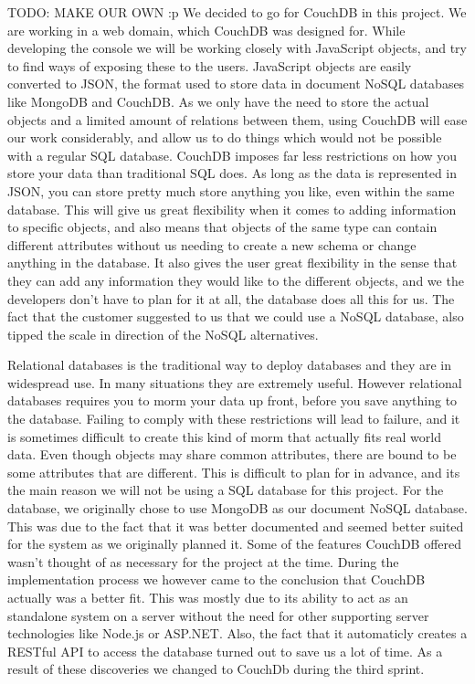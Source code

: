 TODO: MAKE OUR OWN :p
We decided to go for CouchDB in this project. We are working in a web domain, which CouchDB was designed for. While developing the console we will be working closely with JavaScript objects, and try to find ways of exposing these to the users. JavaScript objects are easily converted to JSON, the format used to store data in document NoSQL databases like MongoDB and CouchDB.  As we only have the need to store the actual objects and a limited amount of relations between them, using CouchDB will ease our work considerably, and allow us to do things which would not be possible with a regular SQL database. CouchDB imposes far less restrictions on how you store your data than traditional SQL does. As long as the data is represented in JSON, you can store pretty much store anything you like, even within the same database. This will give us great flexibility when it comes to adding information to specific objects, and also means that objects of the same type can contain different attributes without us needing to create a new schema or change anything in the database. It also gives the user great flexibility in the sense that they can add any information they would like to the different objects, and we the developers don't have to plan for it at all, the database does all this for us. The fact that the customer suggested to us that we could use a NoSQL database, also tipped the scale in direction of the NoSQL alternatives.

Relational databases is the traditional way to deploy databases and they are in widespread use. In many situations they are extremely useful. However relational databases requires you to morm your data up front, before you save anything to the database. Failing to comply with these restrictions will lead to failure, and it is sometimes difficult to create this kind of morm that actually fits real world data. Even though objects may share common attributes, there are bound to be some attributes that are different. This is difficult to plan for in advance, and its the main reason we will not be using a SQL database for this project. For the database, we originally chose to use MongoDB as our document NoSQL database. This was due to the fact that it was better documented and seemed better suited for the system as we originally planned it. Some of the features CouchDB offered wasn't thought of as necessary for the project at the time. During the implementation process we however came to the conclusion that CouchDB actually was a better fit. This was mostly due to its ability to act as an standalone system on a server without the need for other supporting server technologies like Node.js or ASP.NET. Also, the fact that it automaticly creates a RESTful API to access the database turned out to save us a lot of time. As a result of these discoveries we changed to CouchDb during the third sprint.









